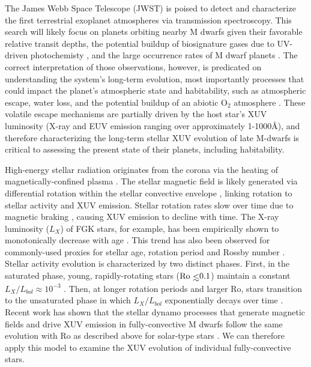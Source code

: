 \documentclass[twocolumn]{aastex62}
\def\lsim{~\rlap{$<$}{\lower 1.0ex\hbox{$\sim$}}}
\begin{document}
The James Webb Space Telescope (JWST) is poised to detect and characterize the first terrestrial exoplanet atmospheres via transmission spectroscopy. This search will likely focus on planets orbiting nearby M dwarfs given their favorable relative transit depths, the potential buildup of biosignature gases due to UV-driven photochemisty \citep{Segura2005}, and the large occurrence rates of M dwarf planets \citep{Dressing2015}. The correct interpretation of those observations, however, is predicated on understanding the system's long-term evolution, most importantly processes that could impact the planet's atmospheric state and habitability, such as atmospheric escape, water loss, and the potential buildup of an abiotic O$_2$ atmosphere \citep{Watson1981,Lammer2003,MurrayClay2009,Luger2015}. These volatile escape mechanisms are partially driven by the host star's XUV luminosity (X-ray and EUV emission ranging over approximately 1-1000\AA), and therefore characterizing the long-term stellar XUV evolution of late M-dwarfs is critical to assessing the present state of their planets, including habitability.

High-energy stellar radiation originates from the corona via the heating of magnetically-confined plasma \citep{Vaiana1981}. The stellar magnetic field is likely generated via differential rotation within the stellar convective envelope \citep{Parker1955}, linking rotation to stellar activity and XUV emission. Stellar rotation rates slow over time due to magnetic braking \citep{Skumanich1972}, causing XUV emission to decline with time. The X-ray luminosity ($L_{X}$) of FGK stars, for example, has been empirically shown to monotonically decrease with age \citep{Jackson2012}. This trend has also been observed for commonly-used proxies for stellar age, rotation period and Rossby number \citep[Ro = $P_{rot}/\tau$ for convective turnover timescale $\tau$,][]{Pizzolato2003,Wright2011}. Stellar activity evolution is characterized by two distinct phases. First, in the saturated phase, young, rapidly-rotating stars ($\mathrm{Ro}\lsim 0.1$) maintain a constant $L_{X}/L_{bol} \approx 10^{-3}$ \citep{Wright2011,Jackson2012}. Then, at longer rotation periods and larger Ro, stars transition to the unsaturated phase in which $L_{X}/L_{bol}$ exponentially decays over time \citep{Pizzolato2003,Ribas2005}. Recent work has shown that the stellar dynamo processes that generate magnetic fields and drive XUV emission in fully-convective M dwarfs follow the same evolution with Ro as described above for solar-type stars \citep{Wright2016,Wright2018}. We can therefore apply this model to examine the XUV evolution of individual fully-convective stars.
\end{document}

